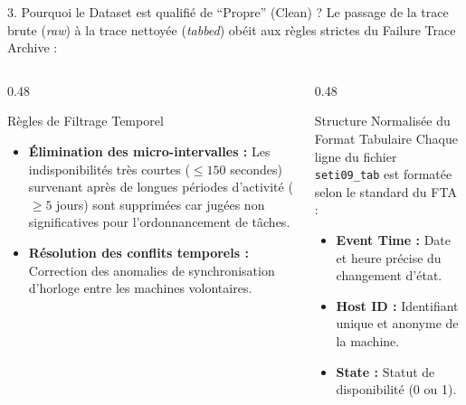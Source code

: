 \documentclass[10pt,aspectratio=169]{beamer}
\begin{document}
\begin{frame}{3. Pourquoi le Dataset est qualifié de ``Propre'' (Clean) ?}
  Le passage de la trace brute (\textit{raw}) à la trace nettoyée (\textit{tabbed}) obéit aux règles strictes du Failure Trace Archive :
  
  \begin{columns}[T]
    \begin{column}{0.48\textwidth}
      \begin{block}{Règles de Filtrage Temporel}
        \begin{itemize}
          \item \textbf{Élimination des micro-intervalles :} Les indisponibilités très courtes ($\le 150$ secondes) survenant après de longues périodes d'activité ($\ge 5$ jours) sont supprimées car jugées non significatives pour l'ordonnancement de tâches.
          \item \textbf{Résolution des conflits temporels :} Correction des anomalies de synchronisation d'horloge entre les machines volontaires.
        \end{itemize}
      \end{block}
    \end{column}
    
    \begin{column}{0.48\textwidth}
      \begin{exampleblock}{Structure Normalisée du Format Tabulaire}
        Chaque ligne du fichier \texttt{seti09\_tab} est formatée selon le standard du FTA :
        \begin{itemize}
          \item \textbf{Event Time :} Date et heure précise du changement d'état.
          \item \textbf{Host ID :} Identifiant unique et anonyme de la machine.
          \item \textbf{State :} Statut de disponibilité (0 ou 1).
        \end{itemize}
      \end{exampleblock}
    \end{column}
  \end{columns}
\end{frame}
\end{document}
